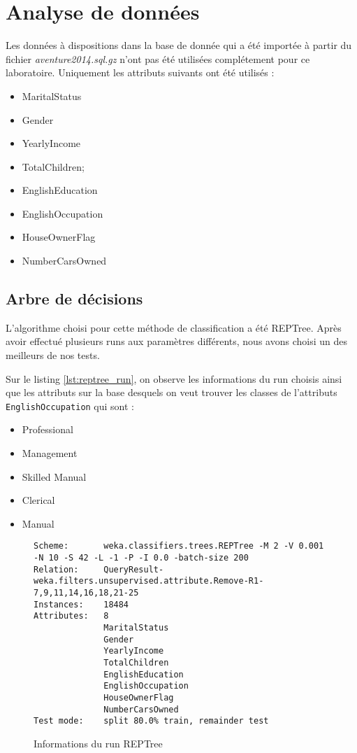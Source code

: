 \chapter{Analyse de données}

Les données à dispositions dans la base de donnée qui a été importée à partir du fichier \textit{aventure2014.sql.gz} n'ont pas été utilisées complétement pour ce laboratoire. Uniquement les attributs suivants ont été utilisés :

\begin{itemize}
	\item MaritalStatus
	\item Gender
	\item YearlyIncome
	\item TotalChildren;
	\item EnglishEducation
	\item EnglishOccupation
	\item HouseOwnerFlag
	\item NumberCarsOwned
\end{itemize}


\section{Arbre de décisions}

L'algorithme choisi pour cette méthode de classification a été REPTree. Après avoir effectué plusieurs runs aux paramètres différents, nous avons choisi un des meilleurs de nos tests.

Sur le listing \autoref{lst:reptree_run}, on observe les informations du run choisis ainsi que les attributs sur la base desquels on veut trouver les classes de l'attributs \texttt{EnglishOccupation} qui sont :

\begin{itemize}
	\item Professional
	\item Management
	\item Skilled Manual
	\item Clerical
	\item Manual
\end{itemize}

\begin{figure}[H]
\centering
\begin{lstlisting}
Scheme:       weka.classifiers.trees.REPTree -M 2 -V 0.001 -N 10 -S 42 -L -1 -P -I 0.0 -batch-size 200
Relation:     QueryResult-weka.filters.unsupervised.attribute.Remove-R1-7,9,11,14,16,18,21-25
Instances:    18484
Attributes:   8
              MaritalStatus
              Gender
              YearlyIncome
              TotalChildren
              EnglishEducation
              EnglishOccupation
              HouseOwnerFlag
              NumberCarsOwned
Test mode:    split 80.0% train, remainder test
\end{lstlisting}
\caption{Informations du run REPTree}
\label{lst:reptree_run}
\end{figure}

